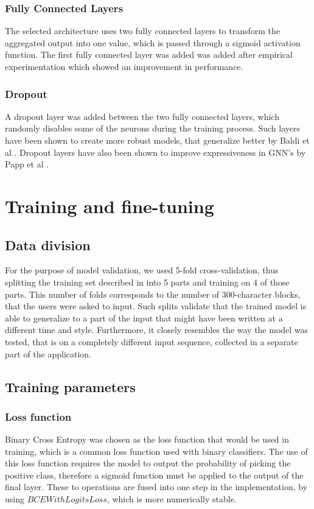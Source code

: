 \subsubsection{Fully Connected Layers}
The selected architecture uses two fully connected layers to transform the aggregated output into one value, 
which is passed through a sigmoid activation function. The first fully connected layer was added was added after empirical experimentation which showed an improvement in performance.

\subsubsection{Dropout}
A dropout layer was added between the two fully connected layers, which randomly disables some of the neurons during the training process. Such layers have been shown to create more robust models, that generalize better by Baldi et al \cite{NIPS2013_71f6278d}. Dropout layers have also been shown to improve expressiveness in GNN's by Papp et al \cite{NEURIPS2021_b8b2926b}.

\section{Training and fine-tuning}

\subsection{Data division}
For the purpose of model validation, we used 5-fold cross-validation, thus splitting the training set described in  into 5 parts and training on 4 of those parts. This number of folds corresponds to the number of 300-character blocks, that the users were asked to input. Such splits validate that the trained model is able to generalize to a part of the input that might have been written at a different time and style. Furthermore, it closely resembles the way the model was tested, that is on a completely different input sequence, collected in a separate part of the application.  

\subsection{Training parameters}

\subsubsection{Loss function}
Binary Cross Entropy was chosen as the loss function that would be used in training, which is a common loss function used with binary classifiers. 
The use of this loss function requires the model to output the probability of picking the positive class, therefore a sigmoid function must be applied to the output of the final layer.
These to operations are fused into one step in the implementation, by using  $BCEWithLogitsLoss$, which is more numerically stable.

